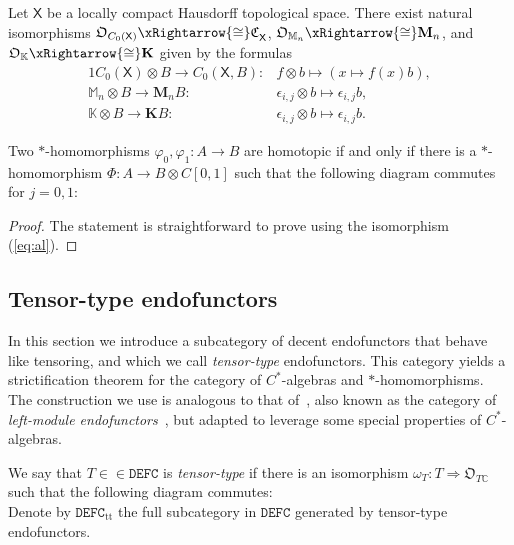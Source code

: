 \documentclass[10pt]{simplearticle}
\newcommand{\tikzinput}[1]{}
\newcommand{\DEFC}{\mathbb{\mathtt{DEFC}}}
\newcommand{\C}{\mathfrak{C}^{\,}}
\newcommand{\oK}{\mathbb{K}}
\newcommand{\fK}{\mathbf{K}}
\newcommand{\fM}{\mathbf{M}}
\newcommand{\oM}{\mathbb{M}}
\newcommand{\ttt}{\operatorname{tt}}
\begin{document}
\begin{lem}\label{lem:39}
Let $\mathsf{X}$ be a locally compact Hausdorff topological
space. There exist natural isomorphisms $\mathfrak{O}_{C_{0}(\mathsf{X})}\xRightarrow{\cong}\C_{\mathsf{X}}$,
$\mathfrak{O}_{\oM_{n}}\xRightarrow{\cong}\fM_{n}$, and $\mathfrak{O}_{\oK}\xRightarrow{\cong}\fK$
given by the formulas
\begin{alignat}{1}
C_{0}(\mathsf{X})\otimes B\to C_{0}(\mathsf{X},B)\colon & f\otimes b\mapsto(x\mapsto f(x)b),\label{eq:al}\\
\oM_{n}\otimes B\to\fM_{n}B\colon & \epsilon_{i,j}\otimes b\mapsto\epsilon_{i,j}b,\nonumber \\
\oK\otimes B\to\fK B\colon & \epsilon_{i,j}\otimes b\mapsto\epsilon_{i,j}b.\nonumber
\end{alignat}
\end{lem}

\begin{lem}\label{lem:alt-homot-Cstar}
Two $*$-homomorphisms $\varphi_{0},\varphi_{1}\colon A\to B$
are homotopic if and only if there is a $*$-homomorphism $\Phi\colon A\to B\otimes C[0,1]$
such that the following diagram commutes for $j=0,1$:
\[
\tikzinput{d366}
\]
\end{lem}

\begin{proof}
The statement is straightforward to prove using the isomorphism (\ref{eq:al}).
\end{proof}

\subsection{\label{subsec:tt}Tensor-type endofunctors}

In this section we introduce a subcategory of decent endofunctors
that behave like tensoring, and which we call \emph{tensor-type} endofunctors.
This category yields a strictification theorem
for
the category of $C^{*}$-algebras and $*$-homomorphisms. The construction
we use is analogous to that of~\cite{street-joyal-93}, also known
as the category of \emph{left-module endofunctors}~\cite{EGNO15,becerra2024strictification},
but adapted to leverage some special properties of $C^{*}$-algebras.
\begin{defn}\label{def:tt}
We say that $T\in\in\DEFC$ is \emph{tensor-type} if
there is an isomorphism $\omega_{T}\colon T\Rightarrow\mathfrak{O}_{T\mathbb{C}}$
such that the following diagram commutes:
\begin{equation}
\tikzinput{d581}\label{eq:tt}
\end{equation}
Denote by $\DEFC_{\ttt}$ the full subcategory in $\DEFC$ generated
by tensor-type endofunctors.
\end{defn}
\end{document}
